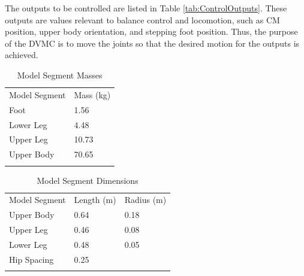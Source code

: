 \documentclass{llncs}
\begin{document}
The outputs to be controlled are listed in Table \ref{tab:ControlOutputs}.  
These outputs are values relevant to balance control and locomotion, such as CM position, upper body orientation, and stepping foot position.  
Thus, the purpose of the DVMC is to move the joints so that the desired motion for the outputs is achieved.  

\begin{table}
\caption{Model Segment Masses}
\label{tab:ModelSegmentMasses}   

\begin{tabular}{p{3cm}p{3cm}}
\hline\noalign{\smallskip}
Model Segment & Mass (kg) \\
\noalign{\smallskip} \hline
Foot & 1.56\\
Lower Leg & 4.48\\
Upper Leg & 10.73\\
Upper Body & 70.65\\
\noalign{\smallskip}\hline\noalign{\smallskip}
\end{tabular}
\end{table}



\begin{table}
\caption{Model Segment Dimensions}
\label{tab:ModelSegmentDimensions}  

\begin{tabular}{p{3cm}p{3cm}p{3cm}}
\hline\noalign{\smallskip}
Model Segment & Length (m) & Radius (m) \\
\noalign{\smallskip} \hline
Upper Body & 0.64 & 0.18\\
Upper Leg & 0.46 & 0.08\\
Lower Leg & 0.48 & 0.05\\
Hip Spacing & 0.25\\
\noalign{\smallskip}\hline\noalign{\smallskip}
\end{tabular}
\end{table}
\end{document}

